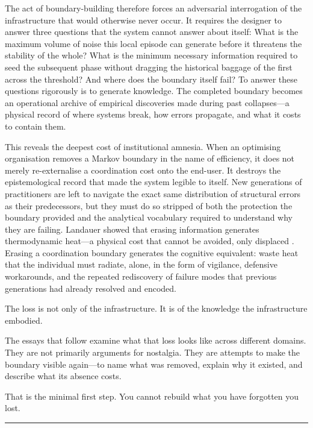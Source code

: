 \documentclass[12pt, a4paper]{article}
\begin{document}
The act of boundary-building therefore forces an adversarial
interrogation of the infrastructure that would otherwise never occur.
It requires the designer to answer three questions that the system
cannot answer about itself: What is the maximum volume of noise this
local episode can generate before it threatens the stability of the
whole? What is the minimum necessary information required to seed the
subsequent phase without dragging the historical baggage of the first
across the threshold? And where does the boundary itself fail? To
answer these questions rigorously is to generate knowledge. The
completed boundary becomes an operational archive of empirical
discoveries made during past collapses---a physical record of where
systems break, how errors propagate, and what it costs to contain
them.

This reveals the deepest cost of institutional amnesia. When an
optimising organisation removes a Markov boundary in the name of
efficiency, it does not merely re-externalise a coordination cost
onto the end-user. It destroys the epistemological record that made
the system legible to itself. New generations of practitioners are
left to navigate the exact same distribution of structural errors as
their predecessors, but they must do so stripped of both the
protection the boundary provided and the analytical vocabulary
required to understand why they are failing. Landauer showed that
erasing information generates thermodynamic heat---a physical cost
that cannot be avoided, only displaced \cite{landauer1961}. Erasing a
coordination boundary generates the cognitive equivalent: waste heat
that the individual must radiate, alone, in the form of vigilance,
defensive workarounds, and the repeated rediscovery of failure modes
that previous generations had already resolved and encoded.

The loss is not only of the infrastructure. It is of the knowledge
the infrastructure embodied.

The essays that follow examine what that loss looks like across
different domains. They are not primarily arguments for nostalgia.
They are attempts to make the boundary visible again---to name what
was removed, explain why it existed, and describe what its absence
costs.

That is the minimal first step. You cannot rebuild what you have
forgotten you lost.

\bigskip
\noindent\rule{\textwidth}{0.4pt}
\end{document}
